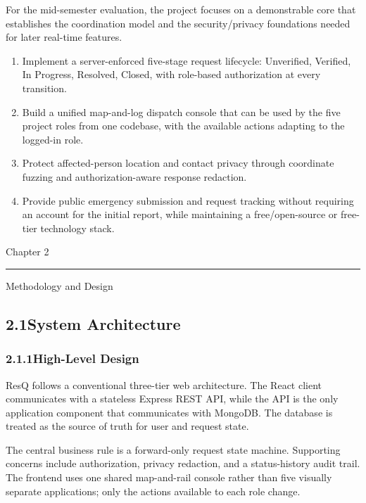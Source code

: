 \documentclass[11pt,a4paper]{article}
\newcommand{\chaptertitle}[2]{%
  \vspace*{0pt}%
  {\normalfont\fontsize{22}{25}\selectfont #1\par}%
  \vspace{2pt}%
  \noindent\rule{\textwidth}{0.7pt}\par
  \vspace{7pt}%
  {\normalfont\fontsize{22}{25}\selectfont #2\par}
  \vspace{5pt}%
}
\begin{document}
For the mid-semester evaluation, the project focuses on a demonstrable core that establishes the coordination model and the security/privacy foundations needed for later real-time features.

\begin{enumerate}
\item Implement a server-enforced five-stage request lifecycle: Unverified, Verified, In Progress, Resolved, Closed, with role-based authorization at every transition.
\item Build a unified map-and-log dispatch console that can be used by the five project roles from one codebase, with the available actions adapting to the logged-in role.
\item Protect affected-person location and contact privacy through coordinate fuzzing and authorization-aware response redaction.
\item Provide public emergency submission and request tracking without requiring an account for the initial report, while maintaining a free/open-source or free-tier technology stack.
\end{enumerate}

\newpage

\chaptertitle{Chapter 2}{Methodology and Design}

\subsection{2.1\quad System Architecture}

\subsubsection{2.1.1\quad High-Level Design}

ResQ follows a conventional three-tier web architecture. The React client communicates with a stateless Express REST API, while the API is the only application component that communicates with MongoDB. The database is treated as the source of truth for user and request state.

The central business rule is a forward-only request state machine. Supporting concerns include authorization, privacy redaction, and a status-history audit trail. The frontend uses one shared map-and-rail console rather than five visually separate applications; only the actions available to each role change.
\end{document}
